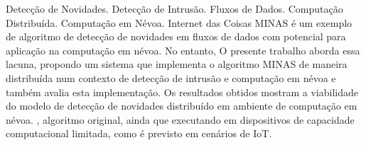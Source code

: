 \begin{resumo}{Detecção de Novidades. Detecção de Intrusão. Fluxos de Dados.
   Computação Distribuída. Computação em Névoa. Internet das Coisas}
   MINAS é um exemplo de algoritmo de detecção de novidades em fluxos de dados
   com potencial para aplicação na computação em névoa.
   No entanto, 
   O presente trabalho aborda essa lacuna, propondo um sistema que implementa o
   algoritmo MINAS de maneira distribuída num contexto de detecção de intrusão e
   computação em névoa e também avalia esta implementação.
   Os resultados obtidos mostram a viabilidade do modelo de detecção de
   novidades distribuído em ambiente de computação em névoa.
   , 
   algoritmo original, ainda que executando em dispositivos de capacidade
   computacional limitada, como é previsto em cenários de IoT.

\end{resumo}

